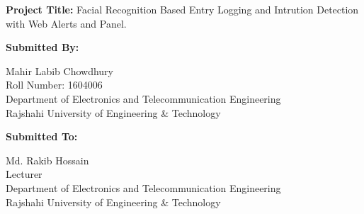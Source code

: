 \begin{titlepage}
\begin{center}
    \end{center}

    \begin{flushleft}
        \begin{Large}
            \textbf{Project Title:} Facial Recognition Based Entry Logging and Intrution Detection with Web Alerts and Panel.\\
            \vspace{.5cm}
        \end{Large}
        \begin{large}
            \textbf{Submitted By:}\\
        \end{large}
        Mahir Labib Chowdhury\\
        Roll Number: 1604006\\
        Department of Electronics and Telecommunication Engineering\\
        Rajshahi University of Engineering \& Technology\\

        \vspace{.5cm}

        \begin{large}
            \textbf{Submitted To:}\\
        \end{large}
        Md. Rakib Hossain\\
        Lecturer\\
        Department of Electronics and Telecommunication Engineering\\
        Rajshahi University of Engineering \& Technology\\
    \end{flushleft}
\end{titlepage}